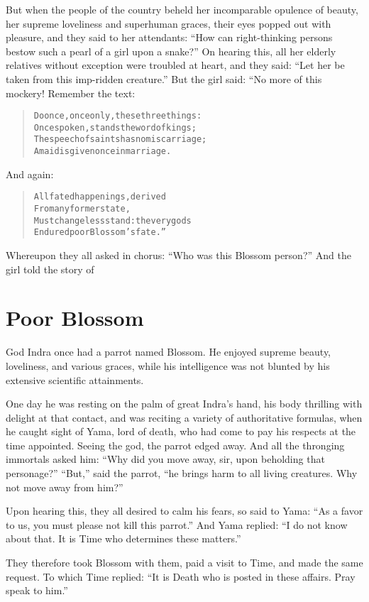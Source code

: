 \documentclass[article, twoside, 14pt]{memoir}
\renewenvironment{verbatim}{%
\begin{quote}%
\vskip -10pt%
\begin{alltt}\normalfont\large}{\end{alltt}%
\end{quote}%
\vskip -10pt
} %
\begin{document}
But when the people of the country beheld her incomparable opulence
of beauty, her supreme loveliness and superhuman graces, their eyes
popped out with pleasure, and they said to her attendants:
``How can right-thinking persons bestow such a pearl of a girl upon a snake?''
On hearing this, all her elderly relatives without exception
were troubled at heart, and they said:
``Let her be taken from this imp-ridden creature.'' But the girl
said: “No more of this mockery! Remember the text:

\begin{verbatim}
Do once, once only, these three things:
Once spoken, stands the word of kings;
The speech of saints has no miscarriage;
A maid is given once in marriage.
\end{verbatim}
And again:

\begin{verbatim}
All fated happenings, derived
    From any former state,
Must changeless stand: the very gods
    Endured poor Blossom's fate.”
\end{verbatim}
Whereupon they all asked in chorus:
``Who was this Blossom person?'' And the girl told the story of
\label{s27}

\chapter{Poor Blossom}

God Indra once had a parrot named Blossom. He enjoyed supreme
beauty, loveliness, and various graces, while his intelligence was
not blunted by his extensive scientific attainments.

One day he was resting on the palm of great Indra's hand, his body
thrilling with delight at that contact, and was reciting a variety
of authoritative formulas, when he caught sight of Yama, lord of
death, who had come to pay his respects at the time appointed.
Seeing the god, the parrot edged away. And all the thronging
immortals asked him:
``Why did you move away, sir, upon beholding that personage?''
``But,'' said the parrot,
``he brings harm to all living creatures. Why not move away from him?''

Upon hearing this, they all desired to calm his fears, so said to
Yama: ``As a favor to us, you must please not kill this parrot.''
And Yama replied:
``I do not know about that. It is Time who determines these matters.''

They therefore took Blossom with them, paid a visit to Time, and
made the same request. To which Time replied:
``It is Death who is posted in these affairs. Pray speak to him.''
\end{document}
